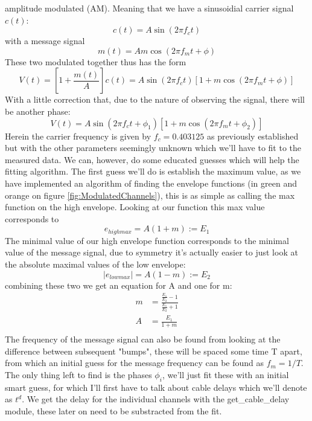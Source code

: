 \documentclass[11pt,a4paper,faculty=we,language=en,doctype=report]{cls/ugent-doc}
\begin{document}
amplitude modulated (AM).  Meaning that we have a sinusoidial
carrier signal $c(t)$:
\begin{equation}
  c(t) = A \sin(2\pi f_c t)
\end{equation}
with a message signal
\begin{equation}
  m(t) = Am \cos(2\pi f_m t + \phi)
\end{equation}
These two modulated together thus has the form
\begin{equation}
  V(t) = \left[1 + \frac{m(t)}{A}\right]c(t) = A\sin(2\pi f_c t)[1 + m\cos(2\pi f_m  t + \phi)]
\end{equation}
With a little correction that, due to the nature of observing the signal, there will be another phase:
\begin{equation}
  V(t) = A\sin(2\pi f_c t + \phi_1)[1 + m\cos(2\pi f_m  t + \phi_2)]
\end{equation}
Herein the carrier frequency is given by $f_c = 0.403125$ as previously
established but with the other parameters seemingly unknown which we'll have to
fit to the measured data.  We can, however, do some educated guesses which will
help the fitting algorithm.  The first guess we'll do is establish the maximum
value, as we have implemented an algorithm of finding the envelope functions
(in green and orange on figure \ref{fig:ModulatedChannels}), this is as simple
as calling the max function on the high envelope. Looking at our function this
max value corresponds to
\begin{equation}
  e_{highmax} = A(1 + m) := E_1
\end{equation}
The minimal value of our high envelope function corresponds to the minimal value of the message signal, due to symmetry
it's actually easier to just look at the absolute maximal values of the low envelope:
\begin{equation}
  |e_{lowmax}| = A(1-m) := E_2
\end{equation}
combining these two we get an equation for A and one for m:
\begin{align}
  m &= \frac{\frac{E_1}{E_2} - 1}{\frac{E_1}{E_2} + 1}\\
  A &= \frac{E_1}{1+m}\\
\end{align}
The frequency of the message signal can also be found from looking at the
difference between subsequent "bumps", these will be spaced some time T apart,
from which an initial guess for the message frequency can be found as $f_m =
1/T$. The only thing left to find is the phases $\phi_i$, we'll just fit these
with an initial smart guess, for which I'll first have to talk about cable
delays which we'll denote as $t^d$.
We get the delay for the individual channels with the get\_cable\_delay
module, these later on need to be substracted from the fit.
\end{document}
